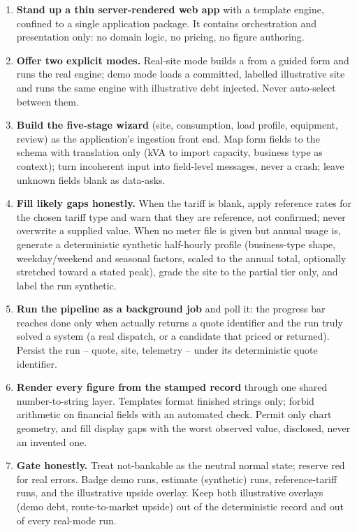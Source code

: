 \begin{rebuild}
\begin{enumerate}
  \item \textbf{Stand up a thin server-rendered web app} with a template engine, confined to a single application package. It contains orchestration and presentation only: no domain logic, no pricing, no figure authoring.
  \item \textbf{Offer two explicit modes.} Real-site mode builds a  from a guided form and runs the real engine; demo mode loads a committed, labelled illustrative site and runs the same engine with illustrative debt injected. Never auto-select between them.
  \item \textbf{Build the five-stage wizard} (site, consumption, load profile, equipment, review) as the application's ingestion front end. Map form fields to the schema with translation only (kVA to import capacity, business type as context); turn incoherent input into field-level messages, never a crash; leave unknown fields blank as data-asks.
  \item \textbf{Fill likely gaps honestly.} When the tariff is blank, apply reference rates for the chosen tariff type and warn that they are reference, not confirmed; never overwrite a supplied value. When no meter file is given but annual usage is, generate a deterministic synthetic half-hourly profile (business-type shape, weekday/weekend and seasonal factors, scaled to the annual total, optionally stretched toward a stated peak), grade the site to the partial tier only, and label the run synthetic.
  \item \textbf{Run the pipeline as a background job} and poll it: the progress bar reaches done only when  actually returns a quote identifier and the run truly solved a system (a real dispatch, or a candidate that priced or returned). Persist the run -- quote, site, telemetry -- under its deterministic quote identifier.
  \item \textbf{Render every figure from the stamped record} through one shared number-to-string layer. Templates format finished strings only; forbid arithmetic on financial fields with an automated check. Permit only chart geometry, and fill display gaps with the worst observed value, disclosed, never an invented one.
  \item \textbf{Gate honestly.} Treat not-bankable as the neutral normal state; reserve red for real errors. Badge demo runs, estimate (synthetic) runs, reference-tariff runs, and the illustrative upside overlay. Keep both illustrative overlays (demo debt, route-to-market upside) out of the deterministic record and out of every real-mode run.

\end{enumerate}
\end{rebuild}
